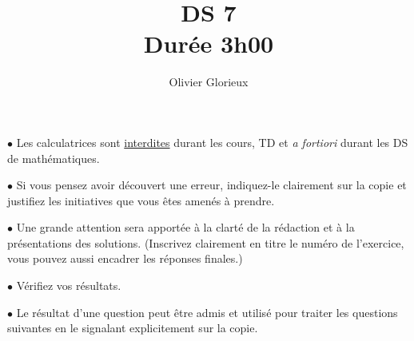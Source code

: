 \documentclass[a4paper, 11pt,reqno]{article}
\author{Olivier Glorieux}
\begin{document}
\title{DS 7\\
\Large{Durée 3h00}
}

\vspace{1cm}
\begin{center}

\begin{description}
\item$\bullet$ Les calculatrices sont \underline{interdites} durant les cours, TD et \emph{a fortiori} durant les DS de mathématiques. \\

\item $\bullet $ Si vous pensez avoir découvert une erreur, indiquez-le clairement sur la copie et justifiez les initiatives que vous êtes amenés à prendre. \\

\item $\bullet$ Une grande attention sera apportée à la clarté de la rédaction et à la présentations des solutions. (Inscrivez clairement en titre le numéro de l'exercice, vous pouvez aussi encadrer les réponses finales.)  \\

\item $\bullet$ Vérifiez vos résultats. \\

\item $\bullet$ Le résultat d'une question peut être admis et utilisé pour traiter les questions suivantes en le signalant explicitement sur la copie. 
\end{description}

\end{center} 
\vspace{1cm}




\newpage
\end{document}
